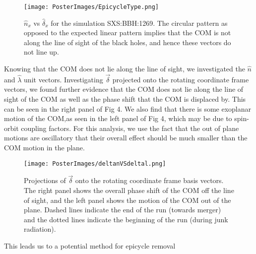 \documentclass{article}
\begin{document}
\begin{figure}
	\center
	\texttt{[image: PosterImages/EpicycleType.png]}
	\caption{$\hat{n}_x$ vs $\hat{\delta}_x$ for the simulation SXS:BBH:1269. The circular pattern as opposed to the expected linear pattern implies that the COM is not along the line of sight of the black holes, and hence these vectors do not line up.}
\end{figure}

Knowing that the COM does not lie along the line of sight, we investigated the $\hat{n}$ and $\hat{\lambda}$ unit vectors. Investigating $\vec{\delta}$ projected onto the rotating coordinate frame vectors, we found further evidence that the COM does not lie along the line of sight of the COM as well as the phase shift that the COM is displaced by. This can be seen in the right panel of Fig 4. We also find that there is some exoplanar motion of the COM,as seen in the left panel of Fig 4, which may be due to spin-orbit coupling factors. For this analysis, we use the fact that the out of plane motions are oscillatory that their overall effect should be much smaller than the COM motion in the plane.

\begin{figure}
	\texttt{[image: PosterImages/deltanVSdeltal.png]}
	\caption{Projections of $\vec{\delta}$ onto the rotating coordinate frame basis vectors. The right panel shows the overall phase shift of the COM off the line of sight, and the left panel shows the motion of the COM out of the plane. Dashed lines indicate the end of the run (towards merger) and the dotted lines indicate the beginning of the run (during junk radiation).}
\end{figure}

This leads us to a potential method for epicycle removal
\end{document}
